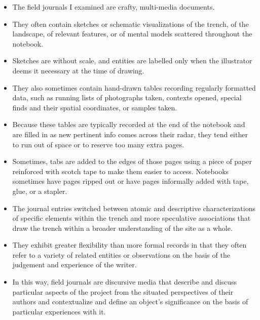 \documentclass{article}
\begin{document}
\begin{itemize}
  \item The field journals I examined are crafty, multi-media documents.
  \item They often contain sketches or schematic visualizations of the trench, of the landscape, of relevant features, or of mental models scattered throughout the notebook.
  \item Sketches are without scale, and entities are labelled only when the illustrator deems it necessary at the time of drawing.
  \item They also sometimes contain hand-drawn tables recording regularly formatted data, such as running lists of photographs taken, contexts opened, special finds and their spatial coordinates, or samples taken.
  \item Because these tables are typically recorded at the end of the notebook and are filled in as new pertinent info comes across their radar, they tend either to run out of space or to reserve too many extra pages.
  \item Sometimes, tabs are added to the edges of those pages using a piece of paper reinforced with scotch tape to make them easier to access. Notebooks sometimes have pages ripped out or have pages informally added with tape, glue, or a stapler.\\
  
  \item The journal entries switched between atomic and descriptive characterizations of specific elements within the trench and more speculative associations that draw the trench within a broader understanding of the site as a whole.
  \item They exhibit greater flexibility than more formal records in that they often refer to a variety of related entities or observations on the basis of the judgement and experience of the writer.
  \item In this way, field journals are discursive media that describe and discuss particular aspects of the project from the situated perspectives of their authors and contextualize and define an object’s significance on the basis of particular experiences with it.\\
  

\end{itemize}
\end{document}
